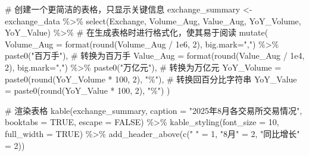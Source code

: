 \documentclass[
  letterpaper,
  DIV=11,
  numbers=noendperiod]{scrartcl}
\newenvironment{Shaded}{\begin{snugshade}}{\end{snugshade}}
\newcommand{\AttributeTok}[1]{\textcolor[rgb]{0.40,0.45,0.13}{#1}}
\newcommand{\CommentTok}[1]{\textcolor[rgb]{0.37,0.37,0.37}{#1}}
\newcommand{\ConstantTok}[1]{\textcolor[rgb]{0.56,0.35,0.01}{#1}}
\newcommand{\DecValTok}[1]{\textcolor[rgb]{0.68,0.00,0.00}{#1}}
\newcommand{\FloatTok}[1]{\textcolor[rgb]{0.68,0.00,0.00}{#1}}
\newcommand{\FunctionTok}[1]{\textcolor[rgb]{0.28,0.35,0.67}{#1}}
\newcommand{\NormalTok}[1]{\textcolor[rgb]{0.00,0.23,0.31}{#1}}
\newcommand{\OtherTok}[1]{\textcolor[rgb]{0.00,0.23,0.31}{#1}}
\newcommand{\SpecialCharTok}[1]{\textcolor[rgb]{0.37,0.37,0.37}{#1}}
\newcommand{\StringTok}[1]{\textcolor[rgb]{0.13,0.47,0.30}{#1}}
\begin{document}
\begin{Shaded}
\begin{Highlighting}[]
\CommentTok{\# 创建一个更简洁的表格，只显示关键信息}
\NormalTok{exchange\_summary }\OtherTok{\textless{}{-}}\NormalTok{ exchange\_data }\SpecialCharTok{\%\textgreater{}\%}
  \FunctionTok{select}\NormalTok{(Exchange, Volume\_Aug, Value\_Aug, YoY\_Volume, YoY\_Value) }\SpecialCharTok{\%\textgreater{}\%}
  \CommentTok{\# 在生成表格时进行格式化，使其易于阅读}
  \FunctionTok{mutate}\NormalTok{(}
    \AttributeTok{Volume\_Aug =} \FunctionTok{format}\NormalTok{(}\FunctionTok{round}\NormalTok{(Volume\_Aug }\SpecialCharTok{/} \FloatTok{1e6}\NormalTok{, }\DecValTok{2}\NormalTok{), }\AttributeTok{big.mark=}\StringTok{","}\NormalTok{) }\SpecialCharTok{\%\textgreater{}\%} \FunctionTok{paste0}\NormalTok{(}\StringTok{"百万手"}\NormalTok{), }\CommentTok{\# 转换为百万手}
    \AttributeTok{Value\_Aug =} \FunctionTok{format}\NormalTok{(}\FunctionTok{round}\NormalTok{(Value\_Aug }\SpecialCharTok{/} \FloatTok{1e4}\NormalTok{, }\DecValTok{2}\NormalTok{), }\AttributeTok{big.mark=}\StringTok{","}\NormalTok{) }\SpecialCharTok{\%\textgreater{}\%} \FunctionTok{paste0}\NormalTok{(}\StringTok{"万亿元"}\NormalTok{),   }\CommentTok{\# 转换为万亿元}
    \AttributeTok{YoY\_Volume =} \FunctionTok{paste0}\NormalTok{(}\FunctionTok{round}\NormalTok{(YoY\_Volume }\SpecialCharTok{*} \DecValTok{100}\NormalTok{, }\DecValTok{2}\NormalTok{), }\StringTok{"\%"}\NormalTok{), }\CommentTok{\# 转换回百分比字符串}
    \AttributeTok{YoY\_Value =} \FunctionTok{paste0}\NormalTok{(}\FunctionTok{round}\NormalTok{(YoY\_Value }\SpecialCharTok{*} \DecValTok{100}\NormalTok{, }\DecValTok{2}\NormalTok{), }\StringTok{"\%"}\NormalTok{)}
\NormalTok{  )}

\CommentTok{\# 渲染表格}
\FunctionTok{kable}\NormalTok{(exchange\_summary, }\AttributeTok{caption =} \StringTok{"2025年8月各交易所交易情况"}\NormalTok{, }\AttributeTok{booktabs =} \ConstantTok{TRUE}\NormalTok{, }\AttributeTok{escape =} \ConstantTok{FALSE}\NormalTok{) }\SpecialCharTok{\%\textgreater{}\%}
  \FunctionTok{kable\_styling}\NormalTok{(}\AttributeTok{font\_size =} \DecValTok{10}\NormalTok{, }\AttributeTok{full\_width =} \ConstantTok{TRUE}\NormalTok{) }\SpecialCharTok{\%\textgreater{}\%}
  \FunctionTok{add\_header\_above}\NormalTok{(}\FunctionTok{c}\NormalTok{(}\StringTok{" "} \OtherTok{=} \DecValTok{1}\NormalTok{, }\StringTok{"8月"} \OtherTok{=} \DecValTok{2}\NormalTok{, }\StringTok{"同比增长"} \OtherTok{=} \DecValTok{2}\NormalTok{))}
\end{Highlighting}
\end{Shaded}
\end{document}

